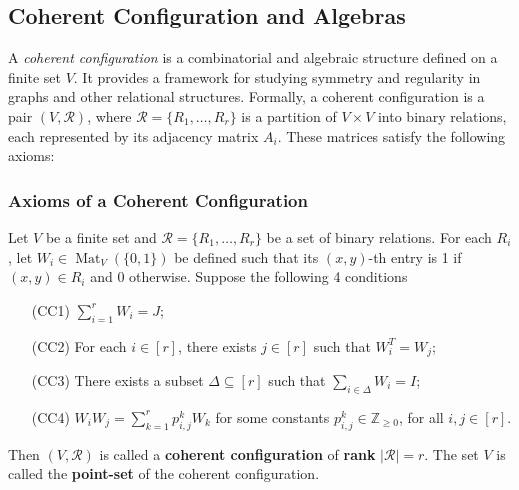 \subsection{Coherent Configuration and Algebras}
A \textit{coherent configuration} \cite{greaves2024coherentrankgrapheigenvalues} is a combinatorial and algebraic structure defined on a finite set \( V \). It provides a framework for studying symmetry and regularity in graphs and other relational structures. Formally, a coherent configuration is a pair \( (V, \mathcal{R}) \), where \( \mathcal{R} = \{R_1, \ldots, R_r\} \) is a partition of \( V \times V \) into binary relations, each represented by its adjacency matrix \( A_i \). These matrices satisfy the following axioms:

\subsubsection*{Axioms of a Coherent Configuration}

\begin{definition} \label{def:coherent-configuration}
Let $V$ be a finite set and $\mathcal{R}=\{R_1,\dots,R_r\}$ be a set of binary relations. For each $R_i$, let $W_i\in\operatorname{Mat}_V(\{0,1\})$ be defined such that its $(x,y)$-th entry is 1 if $(x,y)\in R_i$ and 0 otherwise. Suppose the following 4 conditions
\begin{itemize}
    \item[(CC1)] \quad \( \sum_{i=1}^{r} W_i = J \);
    \item[(CC2)] \quad For each \( i \in [r] \), there exists \( j \in [r] \) such that \( W_i^T = W_j \);
    \item[(CC3)] \quad There exists a subset \( \Delta \subseteq [r]\) such that \( \sum_{i \in \Delta} W_i = I \);
    \item[(CC4)] \quad \( W_i W_j = \sum_{k=1}^{r} p^k_{i,j} W_k \) for some constants \( p^k_{i,j} \in \mathbb{Z}_{\geq 0} \), for all \( i, j \in [r] \).
\end{itemize}
\end{definition}
Then $(V,\mathcal{R})$ is called a \textbf{coherent configuration} of \textbf{rank} $|\mathcal{R}|=r$. The set $V$ is called the \textbf{point-set} of the coherent configuration.

